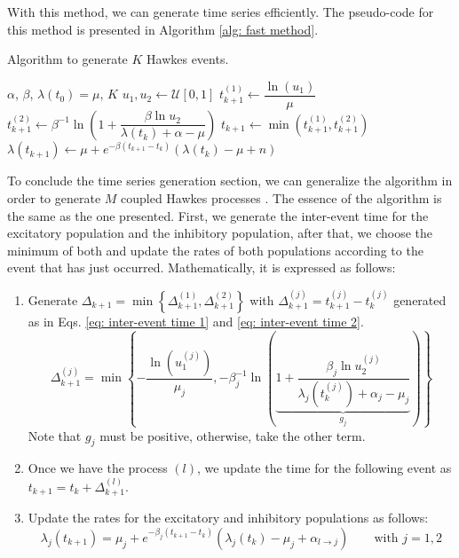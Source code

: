 With this method, we can generate time series efficiently. The pseudo-code for this method is presented in Algorithm \ref{alg: fast method}.
\begin{algorithm}
    \caption{Algorithm to generate $K$ Hawkes events.}\label{alg: fast method}
    \begin{algorithmic}
        \Require $\alpha$, $\beta$, $\lambda(t_0)=\mu$, $K$
            \State $u_1,u_2 \gets \mathcal{U}[0,1]$
            \State $t_{k+1}^{(1)}\gets \dfrac{\ln(u_1)}{\mu}$
            \State $t_{k+1}^{(2)} \gets \beta^{-1}\ln\left( 1+\dfrac{\beta\ln u_2}{\lambda(t_k)+\alpha-\mu} \right)$
            \State $t_{k+1} \gets \min\left( t_{k+1}^{(1)},t_{k+1}^{(2)} \right)$
            \State $\lambda(t_{k+1}) \gets \mu + e^{-\beta(t_{k+1}-t_k)}\left( \lambda(t_k)-\mu+n \right)$
        \EndFor
    \end{algorithmic}
\end{algorithm}

To conclude the time series generation section, we can generalize the algorithm in order to generate $M$ coupled Hawkes processes \cite{dassios2013exact,laub2021elements}. 
The essence of the algorithm is the 
same as the one presented. First, we generate the inter-event time for the excitatory population and the inhibitory population, after that, we choose the minimum of both and update the
rates of both populations according to the event that has just occurred. Mathematically, it is expressed as follows:

\begin{enumerate}
    \item Generate $\Delta_{k+1} = \min\left\{ \Delta_{k+1}^{(1)},\Delta_{k+1}^{(2)} \right\}$ with $\Delta_{k+1}^{(j)}=t_{k+1}^{(j)}-t_k^{(j)}$ generated 
    as in Eqs. \ref{eq: inter-event time 1} and \ref{eq: inter-event time 2}.
    \begin{equation}
        \Delta_{k+1}^{(j)} = \min \left\{ -\dfrac{\ln(u_1^{(j)})}{\mu_j},-\beta_j^{-1}\ln\left( \underbrace{1+\dfrac{\beta_j\ln u_2^{(j)}}{\lambda_j\left( t_k^{(j)} \right)+\alpha_j-\mu_j}}_{g_j} \right) \right\}
        \label{eq: inter-event time coupled}
    \end{equation}
    Note that $g_j$ must be positive, otherwise, take the other term.
    \item Once we have the process $(l)$, we update the time for the following event as $t_{k+1}=t_k+\Delta_{k+1}^{(l)}$.
    \item Update the rates for the excitatory and inhibitory populations as follows:
    \begin{equation}
        \lambda_j(t_{k+1}) = \mu_j + e^{-\beta_j(t_{k+1}-t_k)}\left( \lambda_j(t_k)-\mu_j+\alpha_{l\to j} \right) \qquad \text{with } j=1,2
    \end{equation}
\end{enumerate}

